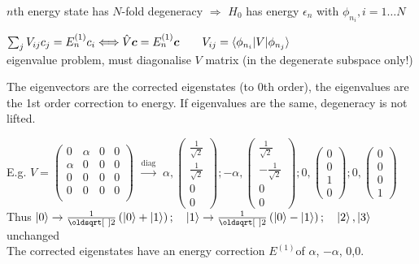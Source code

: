 \begin{squishlist}
    \item $n$th energy state has $N$-fold degeneracy $\Rightarrow$ $H_0$ has energy $\epsilon_n$ with $\phi_{n_i}, i=1 \ldots N$
    \item $\sum_j V_{ij}c_j = E_n^{(1)}c_i \Longleftrightarrow \hat{V} \mbox{\boldmath$c$} = E_n^{(1)} \mbox{\boldmath$c$} \qquad V_{ij} = \braket{\phi_{n_i} | V | \phi_{n_j}}$ \\ 
    eigenvalue problem, must diagonalise $V$ matrix (in the degenerate subspace only!)
    \item The eigenvectors are the corrected eigenstates (to 0th order), the eigenvalues are the 1st order correction to energy. If eigenvalues are the same, degeneracy is not lifted.
    \item E.g. $V = \begin{pmatrix}
        0 & \alpha & 0 & 0 \\
        \alpha  & 0 & 0 & 0 \\
        0 & 0 & 0 & 0 \\
        0 & 0 & 0 & 0 \\
    \end{pmatrix}$ $\overset{\text{diag}}{\longrightarrow}$ 
    $\alpha,  \begin{pmatrix} \frac{1}{\sqrt{2}} \\ \frac{1}{\sqrt{2}} \\ 0 \\ 0 \end{pmatrix};
    - \alpha,  \begin{pmatrix} \frac{1}{\sqrt{2}} \\ -\frac{1}{\sqrt{2}} \\ 0 \\ 0 \end{pmatrix};
    0,  \begin{pmatrix} 0 \\ 0 \\ 1 \\ 0 \end{pmatrix};
    0,  \begin{pmatrix} 0 \\ 0 \\ 0 \\ 1 \end{pmatrix} $\\
    Thus $\ket{0} \rightarrow \frac{1}{\sqrt{2}}\left( \ket{0} + \ket{1}\right);\quad \ket{1} \rightarrow \frac{1}{\sqrt{2}}\left( \ket{0} - \ket{1}\right); \quad \ket{2},\ket{3}$ unchanged\\
    The corrected eigenstates have an energy correction $E^{(1)}$of $\alpha$, $-\alpha$, 0,0.
\end{squishlist}
\columnbreak


